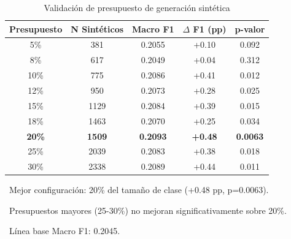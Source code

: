 \begin{table}[htbp]
\centering
\caption{Validación de presupuesto de generación sintética}
\label{tab:budget_validation}
\begin{tabular}{ccccc}
\toprule
\textbf{Presupuesto} & \textbf{N Sintéticos} & \textbf{Macro F1} & \textbf{$\Delta$ F1 (pp)} & \textbf{p-valor} \\
\midrule
5\%  & 381  & 0.2055 & +0.10 & 0.092 \\
8\%  & 617  & 0.2049 & +0.04 & 0.312 \\
10\% & 775  & 0.2086 & +0.41 & 0.012 \\
12\% & 950  & 0.2073 & +0.28 & 0.025 \\
15\% & 1129 & 0.2084 & +0.39 & 0.015 \\
18\% & 1463 & 0.2070 & +0.25 & 0.034 \\
\rowcolor{green!20}
\textbf{20\%} & \textbf{1509} & \textbf{0.2093} & \textbf{+0.48} & \textbf{0.0063} \\
25\% & 2039 & 0.2083 & +0.38 & 0.018 \\
30\% & 2338 & 0.2089 & +0.44 & 0.011 \\
\bottomrule
\end{tabular}
\vspace{0.5em}\footnotesize

\textbullet\ Mejor configuración: 20\% del tamaño de clase (+0.48 pp, p=0.0063).

\textbullet\ Presupuestos mayores (25-30\%) no mejoran significativamente sobre 20\%.

\textbullet\ Línea base Macro F1: 0.2045.

\end{table}
